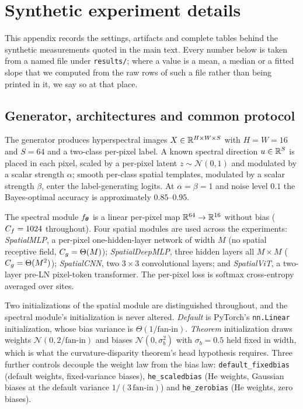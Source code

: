 \section{Synthetic experiment details}
\label{app:synthetic}

This appendix records the settings, artifacts and complete tables behind the
synthetic measurements quoted in the main text. Every number below is taken
from a named file under \texttt{results/}; where a value is a mean, a median
or a fitted slope that we computed from the raw rows of such a file rather
than being printed in it, we say so at that place.

\subsection{Generator, architectures and common protocol}
\label{app:synthetic_setup}

The generator produces hyperspectral images $X \in \mathbb{R}^{H \times W \times S}$
with $H = W = 16$ and $S = 64$ and a two-class per-pixel label. A known
spectral direction $u \in \mathbb{R}^S$ is placed in each pixel, scaled by a per-pixel
latent $z \sim \mathcal{N}(0,1)$ and modulated by a scalar strength $\alpha$;
smooth per-class spatial templates, modulated by a scalar strength $\beta$,
enter the label-generating logits. At $\alpha = \beta = 1$ and noise level
$0.1$ the Bayes-optimal accuracy is approximately $0.85$--$0.95$.

The spectral module $f_{\boldsymbol{\theta}}$ is a linear per-pixel map $\mathbb{R}^{64} \to \mathbb{R}^{16}$
without bias ($C_f = 1024$ throughout). Four spatial modules are used across
the experiments: \emph{SpatialMLP}, a per-pixel one-hidden-layer network of
width $M$ (no spatial receptive field, $C_g = \Theta(M)$); \emph{SpatialDeepMLP},
three hidden layers all $M \times M$ ($C_g = \Theta(M^2)$); \emph{SpatialCNN},
two $3 \times 3$ convolutional layers; and \emph{SpatialViT}, a two-layer
pre-LN pixel-token transformer. The per-pixel loss is softmax cross-entropy
averaged over sites.

Two initializations of the spatial module are distinguished throughout, and
the spectral module's initialization is never altered. \emph{Default} is
PyTorch's \texttt{nn.Linear} initialization, whose bias variance is
$\Theta(1/\mathrm{fan\text{-}in})$. \emph{Theorem} initialization draws weights
$\mathcal{N}(0, 2/\mathrm{fan\text{-}in})$ and biases $\mathcal{N}(0,
\sigma_b^2)$ with $\sigma_b = 0.5$ held fixed in width, which is what the
curvature-disparity theorem's head hypothesis requires. Three further
controls decouple the weight law from the bias law:
\texttt{default\_fixedbias} (default weights, fixed-variance biases),
\texttt{he\_scaledbias} (He weights, Gaussian biases at the default variance
$1/(3\,\mathrm{fan\text{-}in})$) and \texttt{he\_zerobias} (He weights, zero
biases).

